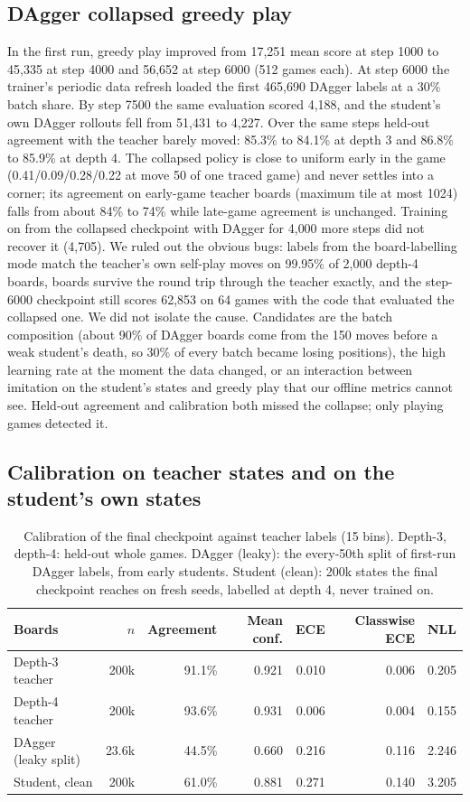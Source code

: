 \documentclass{article}
\begin{document}
\subsection{DAgger collapsed greedy play}
\label{sec:dagger}
In the first run, greedy play improved from 17{,}251 mean score at step 1000 to 45{,}335 at step 4000 and 56{,}652 at step 6000 (512 games each).
At step 6000 the trainer's periodic data refresh loaded the first 465{,}690 DAgger labels at a 30\% batch share.
By step 7500 the same evaluation scored 4{,}188, and the student's own DAgger rollouts fell from 51{,}431 to 4{,}227.
Over the same steps held-out agreement with the teacher barely moved: 85.3\% to 84.1\% at depth 3 and 86.8\% to 85.9\% at depth 4.
The collapsed policy is close to uniform early in the game (0.41/0.09/0.28/0.22 at move 50 of one traced game) and never settles into a corner; its agreement on early-game teacher boards (maximum tile at most 1024) falls from about 84\% to 74\% while late-game agreement is unchanged.
Training on from the collapsed checkpoint with DAgger for 4{,}000 more steps did not recover it (4{,}705).
We ruled out the obvious bugs: labels from the board-labelling mode match the teacher's own self-play moves on 99.95\% of 2{,}000 depth-4 boards, boards survive the round trip through the teacher exactly, and the step-6000 checkpoint still scores 62{,}853 on 64 games with the code that evaluated the collapsed one.
We did not isolate the cause.
Candidates are the batch composition (about 90\% of DAgger boards come from the 150 moves before a weak student's death, so 30\% of every batch became losing positions), the high learning rate at the moment the data changed, or an interaction between imitation on the student's states and greedy play that our offline metrics cannot see.
Held-out agreement and calibration both missed the collapse; only playing games detected it.

\subsection{Calibration on teacher states and on the student's own states}
\label{sec:calibration}
\begin{table}[t]
\centering
\caption{Calibration of the final checkpoint against teacher labels (15 bins). Depth-3, depth-4: held-out whole games. DAgger (leaky): the every-50th split of first-run DAgger labels, from early students. Student (clean): 200k states the final checkpoint reaches on fresh seeds, labelled at depth 4, never trained on.}
\label{tab:calib}
\small
\begin{tabular}{lrrrrrr}
\toprule
Boards & $n$ & Agreement & Mean conf. & ECE & Classwise ECE & NLL \\
\midrule
Depth-3 teacher & 200k & 91.1\% & 0.921 & 0.010 & 0.006 & 0.205 \\
Depth-4 teacher & 200k & 93.6\% & 0.931 & 0.006 & 0.004 & 0.155 \\
DAgger (leaky split) & 23.6k & 44.5\% & 0.660 & 0.216 & 0.116 & 2.246 \\
Student, clean & 200k & 61.0\% & 0.881 & 0.271 & 0.140 & 3.205 \\
\bottomrule
\end{tabular}
\end{table}
\end{document}
